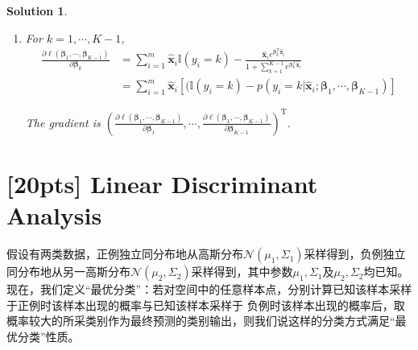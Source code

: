 \documentclass[a4paper,UTF8]{article}
\numberwithin{equation}{section}
\newtheorem*{solution}{Solution}
\begin{document}
\begin{solution}
\begin{enumerate}[(1)]
\begin{equation}
\begin{split}
 &=\ln [(\sum_{k=1}^{K-1} \mathbb{I}(y_i=k) e^{\bm{\beta}_k^\mathrm{T}\hat{\mathbf{x}}_i}) + \mathbb{I}(y_i=K)] -\ln (1+ \sum_{k=1}^{K-1} e^{\bm{\beta}_k^\mathrm{T}\hat{\mathbf{x}}_i}) \\
 &= (\sum_{k=1}^{K-1} \mathbb{I}(y_i=k) \bm{\beta}_k^\mathrm{T}\hat{\mathbf{x}}_i) + \mathbb{I}(y_i=K)(1-\mathbb{I}(y_i=K)) - \ln (1+ \sum_{k=1}^{K-1} e^{\bm{\beta}_k^\mathrm{T}\hat{\mathbf{x}}_i}) 
\end{split}
\end{equation}
Therefore, the log-likelihood (\ref{original-loglikelihood}) could be rewritten as:
\begin{equation}\label{simplify-loglikelihood}
\ell(\bm{\beta}_1, \cdots, \bm{\beta}_{K-1}) = \sum_{i=1}^m [ (\sum_{k=1}^{K-1} \mathbb{I}(y_i=k) \bm{\beta}_k^\mathrm{T}\hat{\mathbf{x}}_i) + \mathbb{I}(y_i=K)(1-\mathbb{I}(y_i=K)) - \ln (1+ \sum_{k=1}^{K-1} e^{\bm{\beta}_k^\mathrm{T}\hat{\mathbf{x}}_i}) ]
\end{equation}

\item
For $k=1, \cdots, K-1$, 
\begin{equation}
\begin{split}
\frac{\partial \ell(\bm{\beta}_1, \cdots, \bm{\beta}_{K-1})}{\partial \bm{\beta}_k}  &=\sum_{i=1}^m \hat{\mathbf{x}}_i \mathbb{I} (y_i=k) -  \frac{\hat{\mathbf{x}}_i  e^{\bm{\beta}_k^\mathrm{T} \hat{\mathbf{x}}_i} }{1 + \sum_{k=1}^{K-1} e^{\bm{\beta}_k^\mathrm{T} \hat{\mathbf{x}}_i}} \\
 &= \sum_{i=1}^m \hat{\mathbf{x}}_i [ (\mathbb{I} (y_i=k) - p(y_i=k | \hat{\mathbf{x}}_i; \bm{\beta}_1, \cdots, \bm{\beta}_{K-1})]
\end{split}
\end{equation}

The gradient is $(\frac{\partial \ell(\bm{\beta}_1, \cdots, \bm{\beta}_{K-1})}{\partial \bm{\beta}_1}, \cdots, \frac{\partial \ell(\bm{\beta}_1, \cdots, \bm{\beta}_{K-1})}{\partial \bm{\beta}_{K-1}})^\mathrm{T}$.

\end{enumerate}

\end{solution}

\newpage


\section{[20pts] Linear Discriminant Analysis}
假设有两类数据，正例独立同分布地从高斯分布$\mathcal{N}(\mu_1,\Sigma_1)$采样得到，负例独立同分布地从另一高斯分布$\mathcal{N}(\mu_2,\Sigma_2)$采样得到，其中参数$\mu_1,\Sigma_1$及$\mu_2,\Sigma_2$均已知。现在，我们定义“最优分类”：若对空间中的任意样本点，分别计算已知该样本采样于正例时该样本出现的概率与已知该样本采样于
负例时该样本出现的概率后，取概率较大的所采类别作为最终预测的类别输出，则我们说这样的分类方式满足“最优分类”性质。
\end{document}
